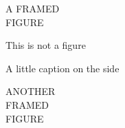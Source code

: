 \documentclass[
    10pt,
    twoside,
    smallroyalvopaper,
]{memoir}
\begin{document}
\begin{figure}[p]
    \begin{framed}
        A FRAMED\\
        FIGURE
    \end{framed}
    \caption{This is not a figure}
\end{figure}

\begin{figure}[p]
    \begin{sidecaption}{A little caption on the side}
        \begin{shaded}
            ANOTHER\\
            FRAMED\\
            FIGURE
        \end{shaded}
    \end{sidecaption}
\end{figure}


\backmatter
\end{document}
